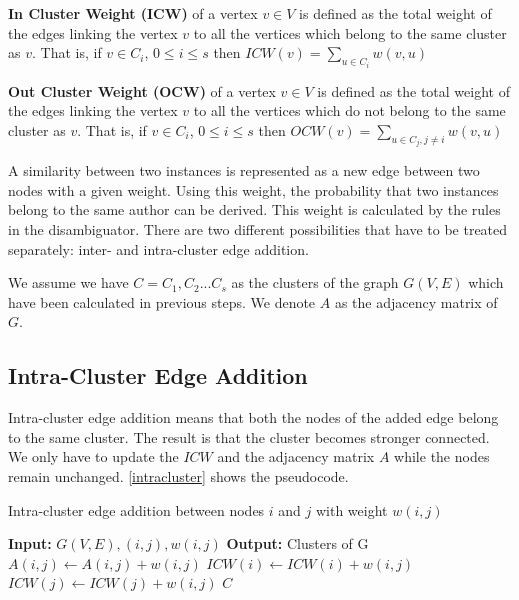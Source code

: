 \begin{mydef}
\textbf{In Cluster Weight (ICW)} of a vertex $v \in V$ is defined as the total weight of the edges linking the vertex $v$ to all the vertices which belong to the same cluster as $v$. That is, if $v \in C_i$, $0 \leq i \leq s$ then $ICW(v) = \sum_{u \in C_i}{w(v,u)}$
\end{mydef}

\begin{mydef}
\textbf{Out Cluster Weight (OCW)} of a vertex $v \in V$ is defined as the total weight of the edges linking the vertex $v$ to all the vertices which do not belong to the same cluster as $v$. That is, if $v \in C_i$, $0 \leq i \leq s$ then $OCW(v) = \sum_{u \in C_j, j \neq i}{w(v,u)}$
\end{mydef}

A similarity between two instances is represented as a new edge between two nodes with a given weight. Using this weight, the probability that two instances belong to the same author can be derived. This weight is calculated by the rules in the disambiguator. There are two different possibilities that have to be treated separately: inter- and intra-cluster edge addition.

We assume we have $C = {C_1,C_2...C_s}$ as the clusters of the graph $G(V,E)$ which have been calculated in previous steps. We denote $A$ as the adjacency matrix of $G$.

\subsection{Intra-Cluster Edge Addition}

Intra-cluster edge addition means that both the nodes of the added edge belong to the same cluster. The result is that the cluster becomes stronger connected. We only have to update the $ICW$ and the adjacency matrix $A$ while the nodes remain unchanged. \autoref{intracluster} shows the pseudocode.

\begin{algorithm}
\caption{Intra-cluster edge addition between nodes $i$ and $j$ with weight $w(i,j)$}
\label{intracluster}
\begin{algorithmic}
\STATE \textbf{Input:} $G(V,E), (i,j), w(i,j)$ 
\STATE \textbf{Output:} Clusters of G
\STATE $A(i,j) \leftarrow A(i,j) + w(i,j)$
\STATE $ICW(i) \leftarrow ICW(i) + w(i,j)$
\STATE $ICW(j) \leftarrow ICW(j) + w(i,j)$
\RETURN $C$
\end{algorithmic}
\end{algorithm}


